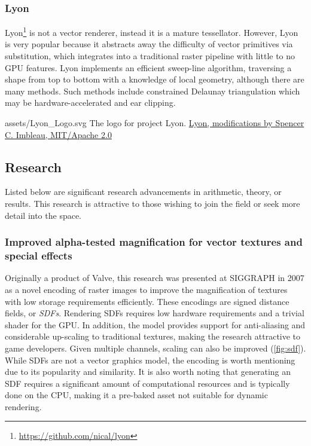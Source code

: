 \subsubsection{Lyon}\label{sec:lyon_lit}
Lyon\footnote{\href{https://github.com/nical/lyon}{https://github.com/nical/lyon}} is not a vector renderer, instead it is a mature tessellator. However, Lyon is very popular because it abstracts away the difficulty of vector primitives via substitution, which integrates into a traditional raster pipeline with little to no GPU features\cite{Lyon}. Lyon implements an efficient sweep-line algorithm, traversing a shape from top to bottom with a knowledge of local geometry\cite{Lyon_Sweep}, although there are many methods. Such methods include constrained Delaunay triangulation\cite{Chew87} which may be hardware-accelerated\cite{Qi12} and ear clipping\cite{Eberly02}.\medskip

\smallsvg
{assets/Lyon_Logo.svg}
{The logo for project Lyon.}
{\href{https://github.com/nical/lyon}{Lyon, modifications by Spencer C. Imbleau, MIT/Apache 2.0}}
\medskip

\subsection{Research}
Listed below are significant research advancements in arithmetic, theory, or results. This research is attractive to those wishing to join the field or seek more detail into the space.

\subsubsection{Improved alpha-tested magnification for vector textures and special effects}\cite{Green07}

Originally a product of Valve, this research was presented at SIGGRAPH in 2007 as a novel encoding of raster images to improve the magnification of textures with low storage requirements efficiently. These encodings are signed distance fields, or \emph{SDFs}. Rendering SDFs requires low hardware requirements and a trivial shader for the GPU. In addition, the model provides support for anti-aliasing and considerable up-scaling to traditional textures, making the research attractive to game developers. Given multiple channels, scaling can also be improved\cite{Chlumsky17} (\cref{fig:sdf}). While SDFs are not a vector graphics model, the encoding is worth mentioning due to its popularity and similarity. It is also worth noting that generating an SDF requires a significant amount of computational resources and is typically done on the CPU, making it a pre-baked asset not suitable for dynamic rendering.\medskip

